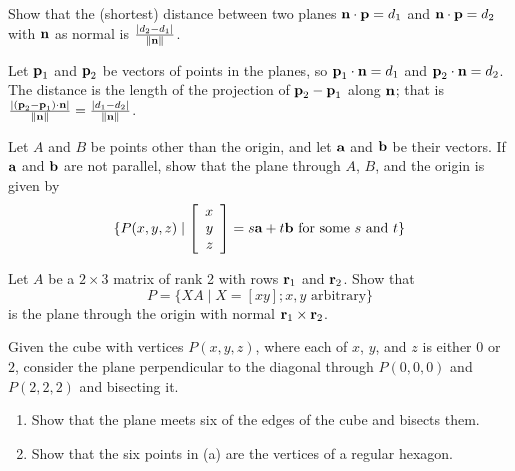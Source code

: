 \begin{multicols}{2}
\begin{ex}
Show that the (shortest) distance between two planes $\textbf{n} \cdot \textbf{p} = d_{1}$ and $\textbf{n} \cdot \textbf{p} = d_{2}$ with $\textbf{n}$ as normal is $\tfrac{|d_{2} - d_{1}|}{\| \textbf{n} \|}$.

\begin{sol}
Let $\textbf{p}_{1}$ and $\textbf{p}_{2}$ be vectors of points in the planes, so $\textbf{p}_{1} \cdot \textbf{n} = d_{1}$ and $\textbf{p}_{2} \cdot \textbf{n} = d_{2}$. The distance is the length of the projection of $\textbf{p}_{2} - \textbf{p}_{1}$ along $\textbf{n}$; that is $\tfrac{|(\textbf{p}_{2} - \textbf{p}_{1}) \cdot \textbf{n}|}{\| \textbf{n} \|} = \tfrac{|d_{1} - d_{2}|}{\| \textbf{n} \|}$.
\end{sol}
\end{ex}

\columnbreak
\begin{ex}
Let $A$ and $B$ be points other than the origin, and let $\textbf{a}$ and $\textbf{b}$ be their vectors. If $\textbf{a}$ and $\textbf{b}$ are not parallel, show that the plane through $A$, $B$, and the origin is given by
\begin{equation*}
\{P(x, y, z) \mid
\left[
\begin{array}{r}
x\\
y\\
z
\end{array}
\right] = s\textbf{a} + t\textbf{b} \mbox{ for some } s \mbox{ and } t \} 
\end{equation*}
\end{ex} 

\begin{ex}
Let $A$ be a $2 \times 3$ matrix of rank 2 with rows $\textbf{r}_{1}$ and $\textbf{r}_{2}$. Show that 
\begin{equation*}
P = \{XA \mid X = [x y]; x, y \mbox{ arbitrary}\}
\end{equation*}
 is the plane through the origin with normal $\textbf{r}_{1} \times \textbf{r}_{2}$. 
\end{ex}

\begin{ex}
Given the cube with vertices $P(x, y, z)$, where each of $x$, $y$, and $z$ is either $0$ or $2$, consider the plane perpendicular to the diagonal through $P(0, 0, 0)$ and $P(2, 2, 2)$ and bisecting it.


\begin{enumerate}[label={\alph*.}]
\item Show that the plane meets six of the edges of the cube and bisects them.

\item Show that the six points in (a) are the vertices of a regular hexagon.

\end{enumerate}
\end{ex}
\end{multicols}
